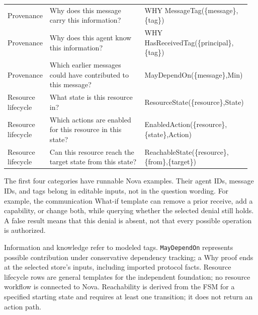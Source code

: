 \documentclass[10pt]{article}
\begin{document}
\begin{longtable}{@{}>{\raggedright\arraybackslash}p{0.15\linewidth} >{\raggedright\arraybackslash}p{0.39\linewidth} >{\raggedright\arraybackslash}p{0.42\linewidth}@{}}
\addlinespace[4pt]
Provenance & Why does this message carry this information? & {\ttfamily\footnotesize WHY MessageTag(\allowbreak \{message\},\allowbreak \{tag\})} \\
\addlinespace[4pt]
Provenance & Why does this agent know this information? & {\ttfamily\footnotesize WHY HasReceivedTag(\allowbreak \{principal\},\allowbreak \{tag\})} \\
\addlinespace[4pt]
Provenance & Which earlier messages could have contributed to this message? & {\ttfamily\footnotesize MayDependOn(\allowbreak \{message\},\allowbreak Min)} \\
\addlinespace[4pt]
Resource lifecycle & What state is this resource in? & {\ttfamily\footnotesize ResourceState(\allowbreak \{resource\},\allowbreak State)} \\
\addlinespace[4pt]
Resource lifecycle & Which actions are enabled for this resource in this state? & {\ttfamily\footnotesize EnabledAction(\allowbreak \{resource\},\allowbreak \{state\},\allowbreak Action)} \\
\addlinespace[4pt]
Resource lifecycle & Can this resource reach the target state from this state? & {\ttfamily\footnotesize ReachableState(\allowbreak \{resource\},\allowbreak \{from\},\allowbreak \{target\})} \\
\end{longtable}
\endgroup

The first four categories have runnable Nova examples. Their agent IDs, message IDs,
and tags belong in editable inputs, not in the question wording. For example, the
communication What-if template can remove a prior receive, add a capability, or
change both, while querying whether the selected denial still holds. A false result
means that this denial is absent, not that every possible operation is authorized.

Information and knowledge refer to modeled tags. \texttt{MayDependOn} represents
possible contribution under conservative dependency tracking; a Why proof ends at
the selected store's inputs, including imported protocol facts. Resource lifecycle
rows are general templates for the independent foundation; no resource workflow is
connected to Nova. Reachability is derived from the FSM for a specified starting state and requires
at least one transition; it does not return an action path.
\end{document}

